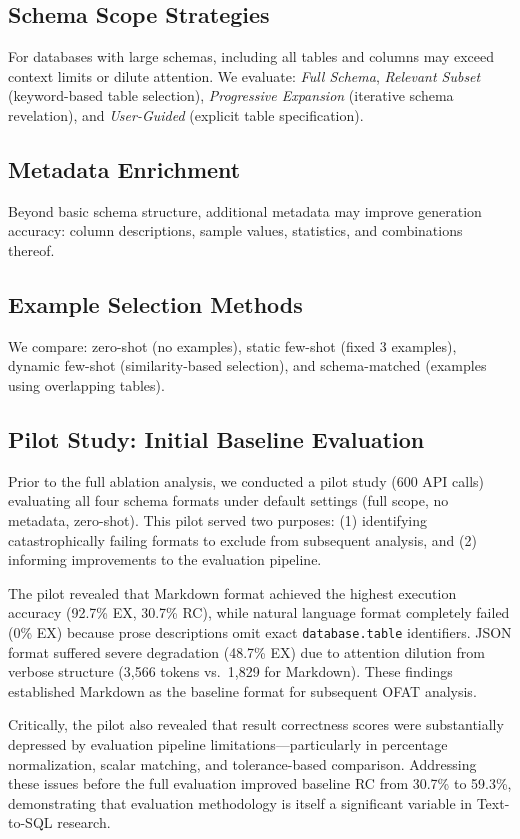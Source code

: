 \documentclass[sigconf, nonacm]{acmart}
\begin{document}
\subsection{Schema Scope Strategies}
For databases with large schemas, including all tables and columns may exceed context limits or dilute attention. We evaluate: \emph{Full Schema}, \emph{Relevant Subset} (keyword-based table selection), \emph{Progressive Expansion} (iterative schema revelation), and \emph{User-Guided} (explicit table specification).

\subsection{Metadata Enrichment}
Beyond basic schema structure, additional metadata may improve generation accuracy: column descriptions, sample values, statistics, and combinations thereof.

\subsection{Example Selection Methods}
We compare: zero-shot (no examples), static few-shot (fixed 3 examples), dynamic few-shot (similarity-based selection), and schema-matched (examples using overlapping tables).

\subsection{Pilot Study: Initial Baseline Evaluation}
\label{sec:pilot}

Prior to the full ablation analysis, we conducted a pilot study (600 API calls) evaluating all four schema formats under default settings (full scope, no metadata, zero-shot). This pilot served two purposes: (1) identifying catastrophically failing formats to exclude from subsequent analysis, and (2) informing improvements to the evaluation pipeline.

The pilot revealed that Markdown format achieved the highest execution accuracy (92.7\% EX, 30.7\% RC), while natural language format completely failed (0\% EX) because prose descriptions omit exact \texttt{database.table} identifiers. JSON format suffered severe degradation (48.7\% EX) due to attention dilution from verbose structure (3,566 tokens vs.\ 1,829 for Markdown). These findings established Markdown as the baseline format for subsequent OFAT analysis.

Critically, the pilot also revealed that result correctness scores were substantially depressed by evaluation pipeline limitations---particularly in percentage normalization, scalar matching, and tolerance-based comparison. Addressing these issues before the full evaluation improved baseline RC from 30.7\% to 59.3\%, demonstrating that evaluation methodology is itself a significant variable in Text-to-SQL research.
\end{document}
